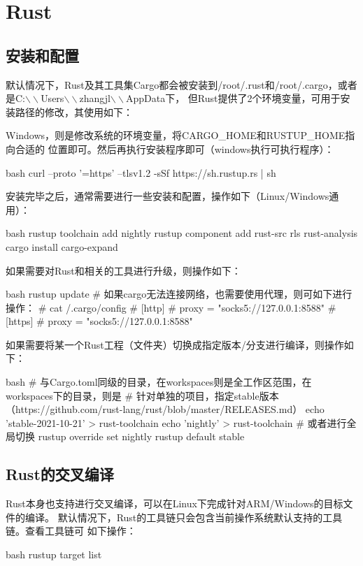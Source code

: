 \chapter{Rust}

\section{安装和配置}
默认情况下，Rust及其工具集Cargo都会被安装到/root/.rust和/root/.cargo，或者
是C:$\backslash\backslash$Users$\backslash\backslash$zhangjl$\backslash\backslash$AppData下，
但Rust提供了2个环境变量，可用于安装路径的修改，其使用如下：
Windows，则是修改系统的环境变量，将CARGO\_HOME和RUSTUP\_HOME指向合适的
位置即可。然后再执行安装程序即可（windows执行可执行程序）：
\begin{code-block}{bash}
curl --proto '=https' --tlsv1.2 -sSf https://sh.rustup.rs | sh
\end{code-block}

安装完毕之后，通常需要进行一些安装和配置，操作如下（Linux/Windows通用）：
\begin{code-block}{bash}
rustup toolchain add nightly
rustup component add rust-src rls rust-analysis
cargo install cargo-expand
\end{code-block}

如果需要对Rust和相关的工具进行升级，则操作如下：
\begin{code-block}{bash}
rustup update
# 如果cargo无法连接网络，也需要使用代理，则可如下进行操作：
# cat /.cargo/config
# [http]
# proxy = "socks5://127.0.0.1:8588"
# [https]
# proxy = "socks5://127.0.0.1:8588"
\end{code-block}
如果需要将某一个Rust工程（文件夹）切换成指定版本/分支进行编译，则操作如下：
\begin{code-block}{bash}
# 与Cargo.toml同级的目录，在workspaces则是全工作区范围，在workspaces下的目录，则是
# 针对单独的项目，指定stable版本（https://github.com/rust-lang/rust/blob/master/RELEASES.md）
echo 'stable-2021-10-21' > rust-toolchain
echo 'nightly' > rust-toolchain
# 或者进行全局切换 rustup override set nightly
rustup default stable
\end{code-block}

\section{Rust的交叉编译}
Rust本身也支持进行交叉编译，可以在Linux下完成针对ARM/Windows的目标文件的编译。
默认情况下，Rust的工具链只会包含当前操作系统默认支持的工具链。查看工具链可
如下操作：
\begin{code-block}{bash}
rustup target list
\end{code-block}

